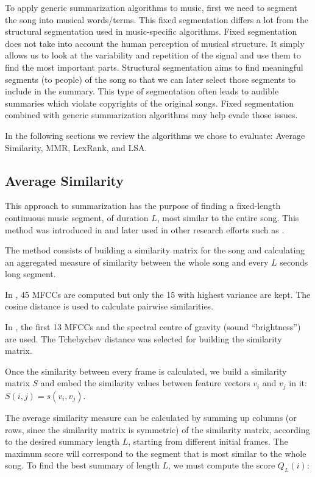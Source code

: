 \documentclass[11pt,onecolumn,draftcls]{IEEEtran}
\begin{document}
To apply generic summarization algorithms to music, first we need to segment the
song into musical words/terms. This fixed segmentation differs a lot from the
structural segmentation used in music-specific algorithms. Fixed segmentation
does not take into account the human perception of musical structure. It simply
allows us to look at the variability and repetition of the signal and use them
to find the most important parts. Structural segmentation aims to find
meaningful segments (to people) of the song so that we can later select those
segments to include in the summary. This type of segmentation often leads to
audible summaries which violate copyrights of the original songs. Fixed
segmentation combined with generic summarization algorithms may help evade those
issues.

In the following sections we review the algorithms we chose to evaluate:
Average Similarity, \ac{MMR}, LexRank, and \ac{LSA}.

\subsection{Average Similarity\label{sub:avg-sim}}
This approach to summarization has the purpose of finding a fixed-length
continuous music segment, of duration $L$, most similar to the entire song. This
method was introduced in \cite{Cooper2002} and later used in other research
efforts such as \cite{Glaczynski2011}.

The method consists of building a similarity matrix for the song and calculating
an aggregated measure of similarity between the whole song and every $L$ seconds
long segment.

In \cite{Cooper2002}, 45 \ac{MFCC}s are computed but only the 15 with highest
variance are kept. The cosine distance is used to calculate pairwise similarities.

In \cite{Glaczynski2011}, the first 13 \ac{MFCC}s and the spectral centre of
gravity (sound ``brightness'') are used. The Tchebychev distance was selected for
building the similarity matrix.

Once the similarity between every frame is calculated, we build a similarity
matrix $S$ and embed the similarity values between feature vectors $v_{i}$ and
$v_{j}$ in it: $S\left(i,j\right)=s\left(v_{i},v_{j}\right)$.

The average similarity measure can be calculated by summing up columns (or rows,
since the similarity matrix is symmetric) of the similarity matrix, according to
the desired summary length $L$, starting from different initial frames. The
maximum score will correspond to the segment that is most similar to the whole
song. To find the best summary of length $L$, we must compute the score
$Q_{L}\left(i\right)$:
\end{document}
